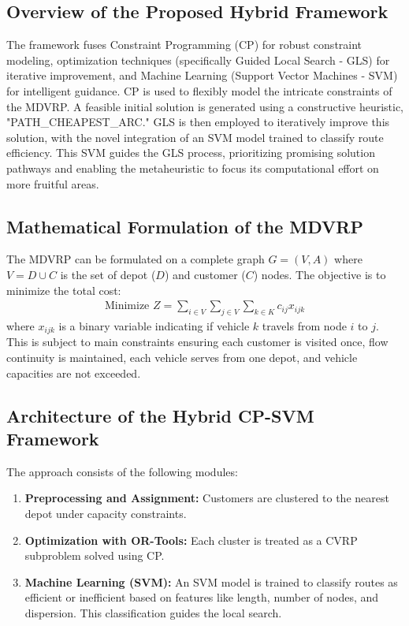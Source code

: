 \documentclass[conference]{IEEEtran} %
\begin{document}
\subsection{Overview of the Proposed Hybrid Framework}
The framework fuses Constraint Programming (CP) for robust constraint modeling, optimization techniques (specifically Guided Local Search - GLS) for iterative improvement, and Machine Learning (Support Vector Machines - SVM) for intelligent guidance. CP is used to flexibly model the intricate constraints of the MDVRP. A feasible initial solution is generated using a constructive heuristic, "PATH\_CHEAPEST\_ARC." GLS is then employed to iteratively improve this solution, with the novel integration of an SVM model trained to classify route efficiency. This SVM guides the GLS process, prioritizing promising solution pathways and enabling the metaheuristic to focus its computational effort on more fruitful areas.

\subsection{Mathematical Formulation of the MDVRP}
The MDVRP can be formulated on a complete graph $G = (V, A)$ where $V = D \cup C$ is the set of depot ($D$) and customer ($C$) nodes. The objective is to minimize the total cost:
\begin{align}
\text{Minimize } Z = \sum_{i \in V} \sum_{j \in V} \sum_{k \in K} c_{ij} x_{ijk} \label{eq:objective}
\end{align}
where $x_{ijk}$ is a binary variable indicating if vehicle $k$ travels from node $i$ to $j$. This is subject to main constraints ensuring each customer is visited once, flow continuity is maintained, each vehicle serves from one depot, and vehicle capacities are not exceeded.

\subsection{Architecture of the Hybrid CP-SVM Framework}
The approach consists of the following modules:
\begin{enumerate}
    \item \textbf{Preprocessing and Assignment:} Customers are clustered to the nearest depot under capacity constraints.
    \item \textbf{Optimization with OR-Tools:} Each cluster is treated as a CVRP subproblem solved using CP.
    \item \textbf{Machine Learning (SVM):} An SVM model is trained to classify routes as efficient or inefficient based on features like length, number of nodes, and dispersion. This classification guides the local search.
\end{enumerate}
\end{document}
